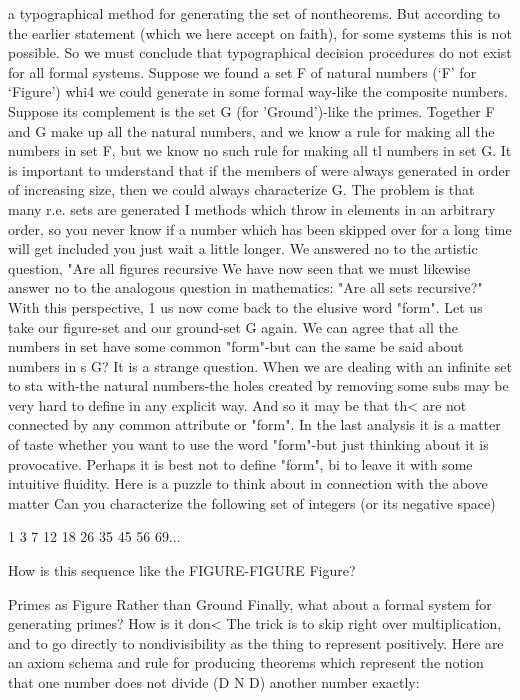 a typographical method for generating the set of nontheorems. But according to the
earlier statement (which we here accept on faith), for some systems this is not possible.
So we must conclude that typographical decision procedures do not exist for all formal
systems.
        Suppose we found a set F of natural numbers (`F' for `Figure') whi4 we could
generate in some formal way-like the composite numbers. Suppose its complement is the
set G (for 'Ground')-like the primes. Together F and G make up all the natural numbers,
and we know a rule for making all the numbers in set F, but we know no such rule for
making all tl numbers in set G. It is important to understand that if the members of were
always generated in order of increasing size, then we could always characterize G. The
problem is that many r.e. sets are generated I methods which throw in elements in an
arbitrary order, so you never know if a number which has been skipped over for a long
time will get included you just wait a little longer.
        We answered no to the artistic question, "Are all figures recursive We have now
seen that we must likewise answer no to the analogous question in mathematics: "Are all
sets recursive?" With this perspective, 1 us now come back to the elusive word "form".
Let us take our figure-set and our ground-set G again. We can agree that all the numbers
in set have some common "form"-but can the same be said about numbers in s G? It is a
strange question. When we are dealing with an infinite set to sta with-the natural
numbers-the holes created by removing some subs may be very hard to define in any
explicit way. And so it may be that th< are not connected by any common attribute or
"form". In the last analysis it is a matter of taste whether you want to use the word
"form"-but just thinking about it is provocative. Perhaps it is best not to define "form", bi
to leave it with some intuitive fluidity.
        Here is a puzzle to think about in connection with the above matter Can you
characterize the following set of integers (or its negative space)

       1       3       7      12      18      26      35     45      56      69...

How is this sequence like the FIGURE-FIGURE Figure?


                           Primes as Figure Rather than Ground
Finally, what about a formal system for generating primes? How is it don< The trick is to
skip right over multiplication, and to go directly to nondivisibility as the thing to
represent positively. Here are an axiom schema and rule for producing theorems which
represent the notion that one number does not divide (D N D) another number exactly:

